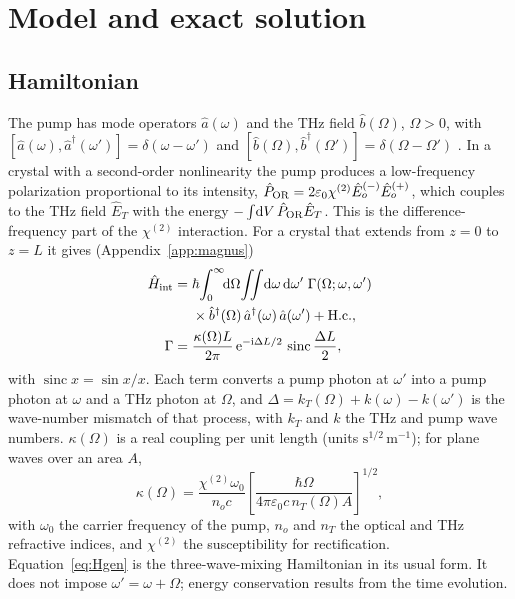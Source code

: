 \documentclass[aps,pra,reprint,superscriptaddress,amsmath,amssymb,floatfix]{revtex4-2}
\newcommand{\dd}{\mathrm{d}}
\newcommand{\ee}{\mathrm{e}}
\newcommand{\ii}{\mathrm{i}}
\newcommand{\sinc}{\operatorname{sinc}}
\begin{document}
\section{Model and exact solution}
\label{sec:model}

\subsection{Hamiltonian}

The pump has mode operators $\hat a(\omega)$ and the THz field
$\hat b(\Omega)$, $\Omega>0$, with
$[\hat a(\omega),\hat a^\dagger(\omega')]=\delta(\omega-\omega')$ and
$[\hat b(\Omega),\hat b^\dagger(\Omega')]=\delta(\Omega-\Omega')$
\cite{blow1990}. In a crystal with a second-order nonlinearity the pump
produces a low-frequency polarization proportional to its intensity,
$\hat P_{\rm OR}=2\varepsilon_0\chi^{(2)}\hat E_o^{(-)}\hat E_o^{(+)}$, which
couples to the THz field $\hat E_T$ with the energy
$-\int\!\dd V\,\hat P_{\rm OR}\hat E_T$. This is the difference-frequency part
of the $\chi^{(2)}$ interaction. For a crystal that extends from $z=0$ to
$z=L$ it gives (Appendix~\ref{app:magnus})
\begin{align}
\hat H_{\rm int}={}&\hbar\!\int_0^\infty\!\!\dd\Omega\!\iint\!\dd\omega\,\dd\omega'\;
\Gamma(\Omega;\omega,\omega')\nonumber\\
&\times\hat b^\dagger(\Omega)\,\hat a^\dagger(\omega)\,\hat a(\omega')+\mathrm{H.c.},
\label{eq:Hgen}\\
\Gamma={}&\frac{\kappa(\Omega)L}{2\pi}\,\ee^{-\ii\Delta L/2}\,
\sinc\frac{\Delta L}{2},
\label{eq:Gamma}
\end{align}
with $\sinc x=\sin x/x$. Each term converts a pump photon at $\omega'$ into a
pump photon at $\omega$ and a THz photon at $\Omega$, and
$\Delta=k_T(\Omega)+k(\omega)-k(\omega')$ is the wave-number mismatch of that
process, with $k_T$ and $k$ the THz and pump wave numbers. $\kappa(\Omega)$ is
a real coupling per unit length (units
$\mathrm{s}^{1/2}\,\mathrm{m}^{-1}$); for plane waves over an area $A$,
\begin{equation}
\kappa(\Omega)=\frac{\chi^{(2)}\omega_0}{n_oc}
\left[\frac{\hbar\Omega}{4\pi\varepsilon_0c\,n_T(\Omega)A}\right]^{1/2},
\label{eq:kappa}
\end{equation}
with $\omega_0$ the carrier frequency of the pump, $n_o$ and $n_T$ the optical
and THz refractive indices, and $\chi^{(2)}$ the susceptibility for
rectification. Equation~\eqref{eq:Hgen} is the three-wave-mixing Hamiltonian
in its usual form. It does not impose $\omega'=\omega+\Omega$; energy
conservation results from the time evolution.
\end{document}
